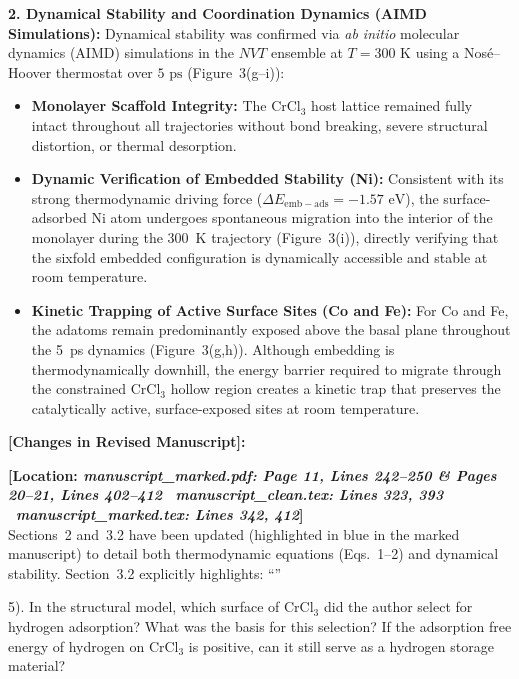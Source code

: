 \documentclass[11pt, sans, a4paper]{moderncv}
\newcommand{\manuscriptchange}[1]{\vspace{0.4em}\noindent\textbf{\color{acsblue}[Changes in Revised Manuscript]:}\par\nopagebreak\vspace{0.15em}#1\vspace{0.4em}}
\begin{document}
\noindent\textbf{2. Dynamical Stability and Coordination Dynamics (AIMD Simulations):}
Dynamical stability was confirmed via \textit{ab initio} molecular dynamics (AIMD) simulations in the $NVT$ ensemble at $T = 300\text{ K}$ using a Nosé--Hoover thermostat over $5\text{ ps}$ (Figure~3(g--i)):
\begin{itemize}[leftmargin=1.5em, itemsep=0.2em]
\item \textbf{Monolayer Scaffold Integrity:} The $\text{CrCl}_3$ host lattice remained fully intact throughout all trajectories without bond breaking, severe structural distortion, or thermal desorption.
\item \textbf{Dynamic Verification of Embedded Stability (Ni):} Consistent with its strong thermodynamic driving force ($\Delta E_{\mathrm{emb-ads}} = -1.57\text{ eV}$), the surface-adsorbed Ni atom undergoes spontaneous migration into the interior of the monolayer during the 300~K trajectory (Figure~3(i)), directly verifying that the sixfold embedded configuration is dynamically accessible and stable at room temperature.
\item \textbf{Kinetic Trapping of Active Surface Sites (Co and Fe):} For Co and Fe, the adatoms remain predominantly exposed above the basal plane throughout the 5~ps dynamics (Figure~3(g,h)). Although embedding is thermodynamically downhill, the energy barrier required to migrate through the constrained CrCl$_3$ hollow region creates a kinetic trap that preserves the catalytically active, surface-exposed sites at room temperature.
\end{itemize}

\manuscriptchange{\textbf{[Location: \textit{manuscript\_marked.pdf: Page 11, Lines 242--250 \& Pages 20--21, Lines 402--412} \textbar\ \textit{manuscript\_clean.tex: Lines 323, 393} \textbar\ \textit{manuscript\_marked.tex: Lines 342, 412}]}\\ Sections~2 and~3.2 have been updated (highlighted in blue in the marked manuscript) to detail both thermodynamic equations (Eqs.~1--2) and dynamical stability. Section~3.2 explicitly highlights: ``{\itshape \ExecuteMetaData[manuscript_marked.tex]{StabilityHierarchy}}''}

\vspace{0.8em}

\begin{reviewercomment}
5). In the structural model, which surface of $\text{CrCl}_3$ did the author select for hydrogen adsorption? What was the basis for this selection? If the adsorption free energy of hydrogen on $\text{CrCl}_3$ is positive, can it still serve as a hydrogen storage material?
\end{reviewercomment}
\end{document}

